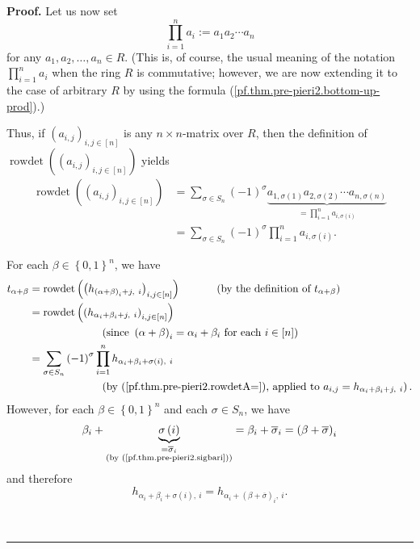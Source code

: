 \documentclass[numbers=enddot,12pt,final,onecolumn,notitlepage,english]{scrartcl}%
\theoremstyle{definition}
\newenvironment{proof}[1][Proof]{\noindent\textbf{#1.} }{\ \rule{0.5em}{0.5em}}
\let\sumnonlimits\sum
\let\prodnonlimits\prod
\renewcommand{\sum}{\sumnonlimits\limits}
\renewcommand{\prod}{\prodnonlimits\limits}
\newenvironment{verlong}{}{}
\begin{document}
\begin{verlong}
\begin{proof}
Let us now set%
\begin{equation}
\prod_{i=1}^{n}a_{i}:=a_{1}a_{2}\cdots a_{n}
\label{pf.thm.pre-pieri2.bottom-up-prod}%
\end{equation}
for any $a_{1},a_{2},\ldots,a_{n}\in R$. (This is, of course, the usual
meaning of the notation $\prod_{i=1}^{n}a_{i}$ when the ring $R$ is
commutative; however, we are now extending it to the case of arbitrary $R$ by
using the formula (\ref{pf.thm.pre-pieri2.bottom-up-prod}).)

Thus, if $\left(  a_{i,j}\right)  _{i,j\in\left[  n\right]  }$ is any $n\times
n$-matrix over $R$, then the definition of $\operatorname*{rowdet}\left(
\left(  a_{i,j}\right)  _{i,j\in\left[  n\right]  }\right)  $ yields%
\begin{align}
\operatorname*{rowdet}\left(  \left(  a_{i,j}\right)  _{i,j\in\left[
n\right]  }\right)   &  =\sum_{\sigma\in S_{n}}\left(  -1\right)  ^{\sigma
}\underbrace{a_{1,\sigma\left(  1\right)  }a_{2,\sigma\left(  2\right)
}\cdots a_{n,\sigma\left(  n\right)  }}_{=\prod_{i=1}^{n}a_{i,\sigma\left(
i\right)  }}\nonumber\\
&  =\sum_{\sigma\in S_{n}}\left(  -1\right)  ^{\sigma}\prod_{i=1}%
^{n}a_{i,\sigma\left(  i\right)  }. \label{pf.thm.pre-pieri2.rowdetA=}%
\end{align}


For each $\beta\in\left\{  0,1\right\}  ^{n}$, we have%
\begin{align}
t_{\alpha+\beta}  &  =\operatorname*{rowdet}\left(  \left(  h_{\left(
\alpha+\beta\right)  _{i}+j,\ i}\right)  _{i,j\in\left[  n\right]  }\right)
\ \ \ \ \ \ \ \ \ \ \left(  \text{by the definition of }t_{\alpha+\beta
}\right) \nonumber\\
&  =\operatorname*{rowdet}\left(  \left(  h_{\alpha_{i}+\beta_{i}%
+j,\ i}\right)  _{i,j\in\left[  n\right]  }\right) \nonumber\\
&  \ \ \ \ \ \ \ \ \ \ \ \ \ \ \ \ \ \ \ \ \left(  \text{since }\left(
\alpha+\beta\right)  _{i}=\alpha_{i}+\beta_{i}\text{ for each }i\in\left[
n\right]  \right) \nonumber\\
&  =\sum_{\sigma\in S_{n}}\left(  -1\right)  ^{\sigma}\prod_{i=1}^{n}%
h_{\alpha_{i}+\beta_{i}+\sigma\left(  i\right)  ,\ i}%
\label{pf.thm.pre-pieri2.t1}\\
&  \ \ \ \ \ \ \ \ \ \ \ \ \ \ \ \ \ \ \ \ \left(  \text{by
(\ref{pf.thm.pre-pieri2.rowdetA=}), applied to }a_{i,j}=h_{\alpha_{i}%
+\beta_{i}+j,\ i}\right)  .\nonumber
\end{align}
However, for each $\beta\in\left\{  0,1\right\}  ^{n}$ and each $\sigma\in
S_{n}$, we have%
\[
\beta_{i}+\underbrace{\sigma\left(  i\right)  }_{\substack{=\overline{\sigma
}_{i}\\\text{(by (\ref{pf.thm.pre-pieri2.sigbari}))}}}=\beta_{i}%
+\overline{\sigma}_{i}=\left(  \beta+\overline{\sigma}\right)  _{i}%
\]
and therefore%
\begin{equation}
h_{\alpha_{i}+\beta_{i}+\sigma\left(  i\right)  ,\ i}=h_{\alpha_{i}+\left(
\beta+\overline{\sigma}\right)  _{i},\ i}. \label{pf.thm.pre-pieri2.h=h1}%
\end{equation}



\end{proof}
\end{verlong}
\end{document}
